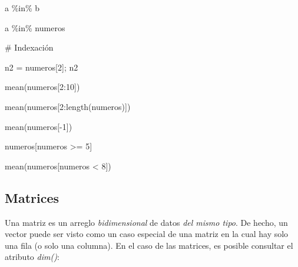 \documentclass[
  spanish,
  letterpaper,
  DIV=11,
  numbers=noendperiod]{scrreprt}
\newenvironment{Shaded}{\begin{snugshade}}{\end{snugshade}}
\newcommand{\CommentTok}[1]{\textcolor[rgb]{0.37,0.37,0.37}{#1}}
\newcommand{\DecValTok}[1]{\textcolor[rgb]{0.68,0.00,0.00}{#1}}
\newcommand{\FunctionTok}[1]{\textcolor[rgb]{0.28,0.35,0.67}{#1}}
\newcommand{\NormalTok}[1]{\textcolor[rgb]{0.00,0.23,0.31}{#1}}
\newcommand{\OtherTok}[1]{\textcolor[rgb]{0.00,0.23,0.31}{#1}}
\newcommand{\SpecialCharTok}[1]{\textcolor[rgb]{0.37,0.37,0.37}{#1}}
\begin{document}
\begin{Shaded}
\begin{Highlighting}[]
\NormalTok{a }\SpecialCharTok{\%in\%}\NormalTok{ b}

\NormalTok{a }\SpecialCharTok{\%in\%}\NormalTok{ numeros}

\CommentTok{\# Indexación}

\NormalTok{n2 }\OtherTok{=}\NormalTok{ numeros[}\DecValTok{2}\NormalTok{]; n2}

\FunctionTok{mean}\NormalTok{(numeros[}\DecValTok{2}\SpecialCharTok{:}\DecValTok{10}\NormalTok{])}

\FunctionTok{mean}\NormalTok{(numeros[}\DecValTok{2}\SpecialCharTok{:}\FunctionTok{length}\NormalTok{(numeros)])}

\FunctionTok{mean}\NormalTok{(numeros[}\SpecialCharTok{{-}}\DecValTok{1}\NormalTok{])}

\NormalTok{numeros[numeros }\SpecialCharTok{\textgreater{}=} \DecValTok{5}\NormalTok{]}

\FunctionTok{mean}\NormalTok{(numeros[numeros }\SpecialCharTok{\textless{}} \DecValTok{8}\NormalTok{])}
\end{Highlighting}
\end{Shaded}

\subsection{Matrices}\label{matrices}

Una matriz es un arreglo \emph{bidimensional} de datos \emph{del mismo
tipo}. De hecho, un vector puede ser visto como un caso especial de una
matriz en la cual hay solo una fila (o solo una columna). En el caso de
las matrices, es posible consultar el atributo \emph{dim()}:
\end{document}
